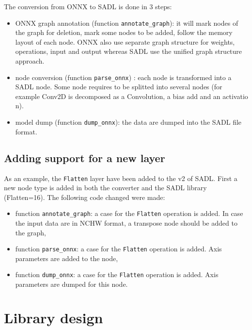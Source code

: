 \documentclass[10pt,a4paper]{article}
\begin{document}
The conversion from ONNX to SADL is done in 3 steps:
\begin{itemize}
\item ONNX graph annotation (function \texttt{annotate\_graph}): it will mark nodes of the graph for deletion, mark some nodes to be added, follow the memory layout of each node. ONNX also use separate graph structure for weights, operations, input and output whereas SADL use the unified graph structure approach.
\item node conversion (function \texttt{parse\_onnx}) : each node is transformed into a SADL node. Some node requires to be splitted into several nodes (for example Conv2D is decomposed as a Convolution, a bias add and an activatio n).
\item model dump (function \texttt{dump\_onnx}): the data are dumped into the SADL file format.
\end{itemize}


\subsection{Adding support for a new layer}
As an example, the \texttt{Flatten} layer have been added to the v2 of SADL. First a new node type is added in both the converter and the SADL library (\textrm{Flatten=16}).
The following code changed were made:
\begin{itemize}
\item function \texttt{annotate\_graph}: a case for the \texttt{Flatten} operation is added. In case the input data are in NCHW format, a transpose node should be added to the graph,
\item function \texttt{parse\_onnx}: a case for the \texttt{Flatten} operation is added. Axis parameters are added to the node,
\item function \texttt{dump\_onnx}: a case for the \texttt{Flatten} operation is added. Axis parameters are dumped for this node.
\end{itemize}

\section{Library design}
\end{document}
